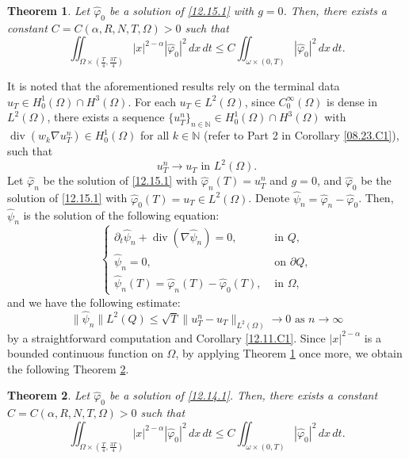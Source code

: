 \documentclass[11pt]{article}
\newtheorem{theorem}{Theorem}[section]
\numberwithin{equation}{section}
\DeclareMathOperator{\Div}{div}
\begin{document}
\begin{theorem}\label{03.01.T1}
Let $\widehat{\varphi}_0$ be a solution of \eqref{12.15.1} with $g = 0$. Then, there exists a constant $C = C(\alpha, R, N, T, \Omega) > 0$ such that
\begin{equation*}
\iint_{\Omega \times \left(\frac{T}{4}, \frac{3T}{4}\right)} |x|^{2-\alpha} |\widehat{\varphi}_0|^2 \, dx \, dt \leq C \iint_{\omega \times (0,T)} |\widehat{\varphi}_0|^2 \, dx \, dt.
\end{equation*}
\end{theorem}
It is noted that the aforementioned results rely on the terminal data $u_T \in H_0^1(\Omega) \cap H^3(\Omega)$. For each $u_T \in L^2(\Omega)$, since $C_0^\infty(\Omega)$ is dense in $L^2(\Omega)$, there exists a sequence $\{u_T^n\}_{n \in \mathbb{N}} \in H_0^1(\Omega) \cap H^3(\Omega)$ with $\Div(w_k \nabla u_T^n) \in H_0^1(\Omega)$ for all $k \in \mathbb{N}$ (refer to Part 2 in Corollary \ref{08.23.C1}), such that
\begin{equation*}
u_T^n \to u_T   \text{ in } L^2(\Omega).
\end{equation*}
Let $\widehat{\varphi}_n$ be the solution of \eqref{12.15.1} with $\widehat{\varphi}_n(T) = u_T^n$ and $g = 0$, and $\widehat{\varphi}_0$ be the solution of \eqref{12.15.1} with $\widehat{\varphi}_0(T) = u_T \in L^2(\Omega)$. Denote $\widehat{\psi}_n = \widehat{\varphi}_n - \widehat{\varphi}_0$. Then, $\widehat{\psi}_n$ is the solution of the following equation:
\begin{equation*}
\begin{cases}
\partial_t \widehat{\psi}_n + \Div(\nabla \widehat{\psi}_n) = 0, &\text{ in } Q, \\
\widehat{\psi}_n = 0, &\text{ on } \partial Q, \\
\widehat{\psi}_n(T) = \widehat{\varphi}_n(T) - \widehat{\varphi}_0(T), &\text{ in } \Omega,
\end{cases}
\end{equation*}
and we have the following estimate:
\begin{equation*}
\|\widehat{\psi}_n\|{L^2(Q)} \leq \sqrt{T} \|u_T^n - u_T\|_{L^2(\Omega)} \to 0   \text{ as } n \to \infty
\end{equation*}
by a straightforward computation and Corollary \ref{12.11.C1}.
Since $|x|^{2-\alpha}$ is a bounded continuous function on $\Omega$, by applying Theorem \ref{03.01.T1} once more, we obtain the following Theorem \ref{04.18.T1-2}.
\begin{theorem}\label{04.18.T1-2}
Let $\widehat{\varphi}_0$ be a solution of \eqref{12.14.1}. Then, there exists a constant $C = C(\alpha, R, N, T, \Omega) > 0$ such that
\begin{equation}\label{guo1} 
\iint_{\Omega \times \left(\frac{T}{4}, \frac{3T}{4}\right)} |x|^{2-\alpha} |\widehat{\varphi}_0|^2 \, dx \, dt \leq C \iint_{\omega \times (0,T)} |\widehat{\varphi}_0|^2 \, dx \, dt.
\end{equation}
\end{theorem}
\end{document}

